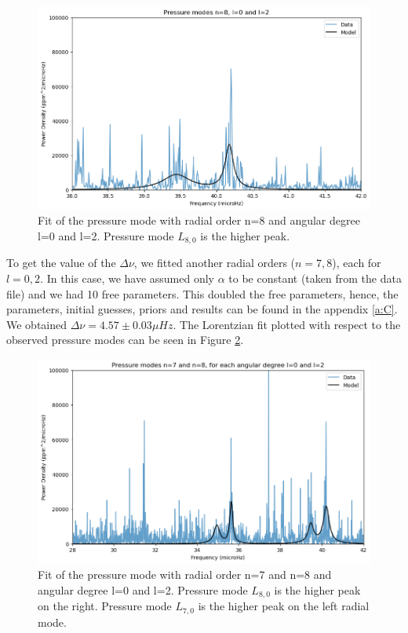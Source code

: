 \documentclass[12pt]{article}
\begin{document}
\begin{figure}[H]
  \centering
  \includegraphics[width=\linewidth]{mode1.png}
  \caption{Fit of the pressure mode with radial order n=8 and angular degree l=0 and l=2. Pressure mode $L_{8,0}$ is the higher peak.}
  \label{fig:fit_pressureMode1}
\end{figure}

To get the value of the $\Delta\nu$, we fitted another radial orders ($n=7,8$), each for $l=0,2$. In this case, we have assumed only $\alpha$ to be constant (taken from the data file) and we had 10 free parameters. This doubled the free parameters, hence, the parameters, initial guesses, priors and results can be found in the appendix \ref{a:C}. We obtained $\Delta\nu = 4.57\pm 0.03 \mu Hz$. The Lorentzian fit plotted with respect to the observed pressure modes can be seen in Figure \ref{fig:fit_pressureMode2}.

\begin{figure}[H]
  \centering
  \includegraphics[width=\linewidth]{mode2.png}
  \caption{Fit of the pressure mode with radial order n=7 and n=8 and angular degree l=0 and l=2. Pressure mode $L_{8,0}$ is the higher peak on the right. Pressure mode $L_{7,0}$ is the higher peak on the left radial mode.}
  \label{fig:fit_pressureMode2}
\end{figure}
\end{document}
